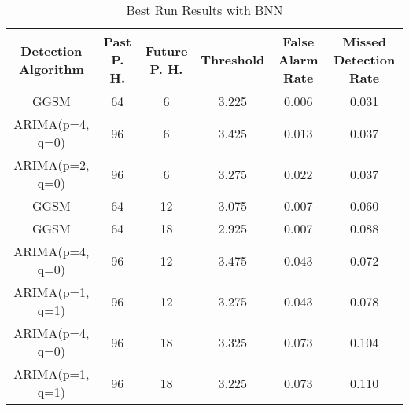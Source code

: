 \begin{table*}[h!]
\centering
\caption{Best Run Results with BNN}
    \label{table:bnnbest}
    \begin{tabular}{|c|c|c|c|c|c|}
        \hline
        Detection Algorithm & Past P. H. & Future P. H. & Threshold & False Alarm Rate & Missed Detection Rate \\
        \hline
        \hline
        GGSM & 64 & 6 & 3.225 &  0.006 & 0.031 \\
        \hline
        ARIMA(p=4, q=0) & 96 & 6 & 3.425 &  0.013 & 0.037 \\
        \hline
        ARIMA(p=2, q=0) & 96 & 6 & 3.275 &  0.022 & 0.037 \\
        \hline
        GGSM & 64 & 12 & 3.075 &  0.007 & 0.060 \\
        \hline
        GGSM & 64 & 18 & 2.925 &  0.007 & 0.088 \\
        \hline
        ARIMA(p=4, q=0) & 96 & 12 & 3.475 &  0.043 & 0.072 \\
        \hline
        ARIMA(p=1, q=1) & 96 & 12 & 3.275 &  0.043 & 0.078 \\
        \hline
        ARIMA(p=4, q=0) & 96 & 18 & 3.325 &  0.073 & 0.104 \\
        \hline
        ARIMA(p=1, q=1) & 96 & 18 & 3.225 &  0.073 & 0.110 \\
        \hline
    \end{tabular}
\end{table*}
